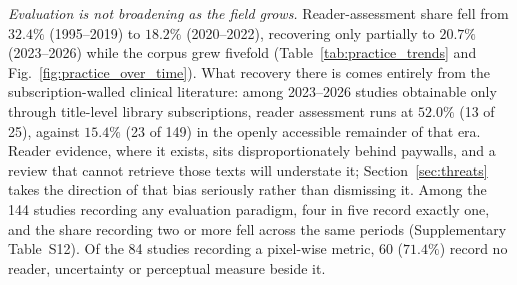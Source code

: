 \documentclass[review,authoryear]{elsarticle}
\begin{document}
\emph{Evaluation is not broadening as the field grows.} Reader-assessment share fell
from $32.4\%$ (1995--2019) to $18.2\%$ (2020--2022), recovering only partially to
$20.7\%$ (2023--2026) while the corpus grew fivefold
(Table~\ref{tab:practice_trends} and Fig.~\ref{fig:practice_over_time}). What recovery
there is comes entirely from the subscription-walled clinical literature: among
2023--2026 studies obtainable only through title-level library subscriptions, reader
assessment runs at $52.0\%$ (13 of 25), against $15.4\%$ (23 of 149) in the openly
accessible remainder of that era. Reader evidence, where it exists, sits
disproportionately behind paywalls, and a review that cannot retrieve those texts will
understate it; Section~\ref{sec:threats} takes the direction of that bias seriously
rather than dismissing it. Among the 144 studies recording any evaluation paradigm,
four in five record exactly one, and the share recording two or more fell across the
same periods (Supplementary Table~S12). Of the 84 studies recording a pixel-wise
metric, 60 ($71.4\%$) record no reader, uncertainty or perceptual measure beside it.
\end{document}
